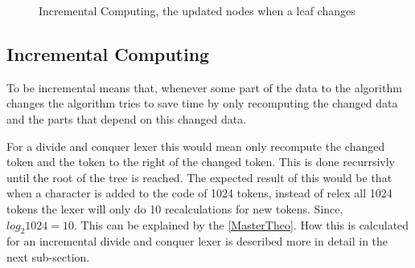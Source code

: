 \begin{figure}[!htp]
\centering
{}
\caption{Incremental Computing, the updated nodes when a leaf changes \label{fig:incUp}}
\end{figure}

\subsection{Incremental Computing}
To be incremental means that, whenever some part of the data to the algorithm
changes the algorithm tries to save time by only recomputing the changed data
and the parts that depend on this changed data. \cite{incrementalDef}

For a divide and conquer lexer this would mean only recompute the changed token
and the token to the right of the changed token. This is done recurrsivly until
the root of the tree is reached. The expected result of this would be that when
a character is added to the code of 1024 tokens, instead of relex all 1024
tokens the lexer will only do 10 recalculations for new tokens. Since,
$log_2 1024 = 10$. This can be explained by the \cref{MasterTheo}. How this is
calculated for an incremental divide and conquer lexer is described more in
detail in the next sub-section.

